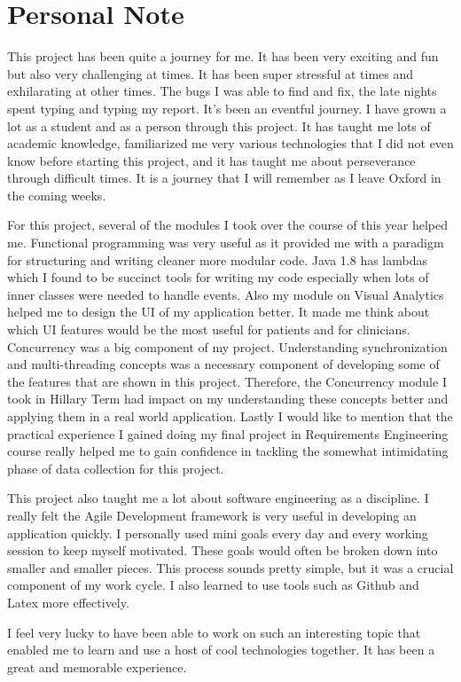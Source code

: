 \section{Personal Note}
This project has been quite a journey for me. It has been very exciting and fun but also very challenging at times. It has been super stressful at times and exhilarating at other times. The bugs I was able to find and fix, the late nights spent typing and typing my report. It's been an eventful journey. I have grown a lot as a student and as a person through this project. It has taught me lots of academic knowledge, familiarized me very various technologies that I did not even know before starting this project, and it has taught me about perseverance through difficult times. It is a journey that I will remember as I leave Oxford in the coming weeks. 

For this project, several of the modules I took over the course of this year helped me. Functional programming was very useful as it provided me with a paradigm for structuring and writing cleaner more modular code. Java 1.8 has lambdas which I found to be succinct tools for writing my code especially when lots of inner classes were needed to handle events. Also my module on Visual Analytics helped me to design the UI of my application better. It made me think about which UI features would be the most useful for patients and for clinicians. Concurrency was a big component of my project. Understanding synchronization and multi-threading concepts was a necessary component of developing some of the features that are shown in this project. Therefore, the Concurrency module I took in Hillary Term had impact on my understanding these concepts better and applying them in a real world application. Lastly I would like to mention that the practical experience I gained doing my final project in Requirements Engineering course really helped me to gain confidence in tackling the somewhat intimidating phase of data collection for this project. 

This project also taught me a lot about software engineering as a discipline. I really felt the Agile Development framework is very useful in developing an application quickly. I personally used mini goals every day and every working session to keep myself motivated. These goals would often be broken down into smaller and smaller pieces. This process sounds pretty simple, but it was a crucial component of my work cycle. I also learned to use tools such as Github and Latex more effectively. 

I feel very lucky to have been able to work on such an interesting topic that enabled me to learn and use a host of cool technologies together. It has been a great and memorable experience. 